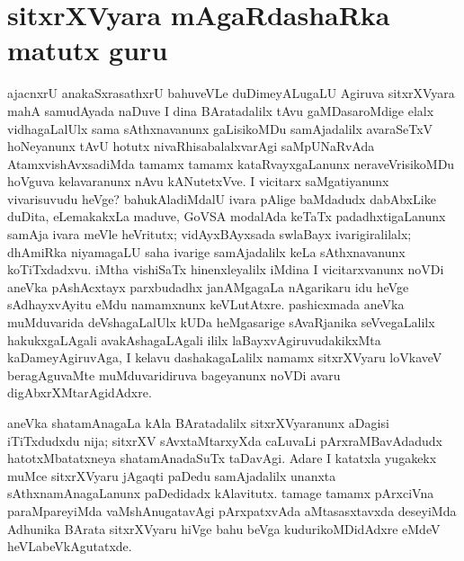 \makeatletter
\def\@makechapterhead#1{%
  \vspace*{10\p@}%
{\fontsize{13pt}{13pt}\selectfont\raggedright{\bf suceVta kaqpalAni}\par}
\vspace*{25\p@}%
  {\parindent \z@ \centering \normalfont
    \ifnum \c@secnumdepth >\m@ne
      \if@mainmatter
        {\LARGE\bfseries  #1}\par\nobreak
	\vskip 4pt
      \fi
    \fi
\smallskip 

 \vskip 10\p@  
{\fontsize{12pt}{12pt}\selectfont\raggedleft{anu: \bf pu.ti.na.}\par}
  }
\vskip 40\p@}
\makeatother

\chapter{sitxrXVyara mAgaRdashaRka matutx guru}


ajacnxrU anakaSxrasathxrU bahuveVLe duDimeyALugaLU Agiruva sitxrXVyara mahA samudAyada naDuve I dina BAratadalilx tAvu gaMDasaroMdige elalx vidhagaLalUlx sama sAthxnavanunx gaLisikoMDu samAjadalilx  avaraSeTxV hoNeyanunx tAvU hotutx nivaRhisabalalxvarAgi saMpUNaRvAda AtamxvishAvxsadiMda tamamx tamamx kataRvayxgaLanunx neraveVrisikoMDu hoVguva kelavaranunx nAvu kANutetxVve. I vicitarx saMgatiyanunx vivarisuvudu heVge? bahukAladiMdalU ivara pAlige baMdadudx dabAbxLike duDita, eLemakakxLa maduve, GoVSA modalAda keTaTx padadhxtigaLanunx samAja ivara meVle heVritutx; vidAyxBAyxsada swlaBayx ivarigiralilalx; dhAmiRka niyamagaLU saha ivarige samAjadalilx keLa sAthxnavanunx koTiTxdadxvu. iMtha vishiSaTx hinenxleyalilx iMdina I vicitarxvanunx noVDi aneVka pAshAcxtayx parxbudadhx janAMgagaLa nAgarikaru idu heVge sAdhayxvAyitu eMdu namamxnunx keVLutAtxre. pashicxmada aneVka muMduvarida deVshagaLalUlx kUDa heMgasarige sAvaRjanika seVvegaLalilx hakukxgaLAgali avakAshagaLAgali ililx laBayxvAgiruvudakikxMta kaDameyAgiruvAga, I kelavu dashakagaLalilx namamx sitxrXVyaru loVkaveV beragAguvaMte muMduvaridiruva bageyanunx noVDi avaru digAbxrXMtarAgidAdxre.

aneVka shatamAnagaLa kAla BAratadalilx sitxrXVyaranunx aDagisi iTiTxdudxdu nija; sitxrXV sAvxtaMtarxyXda caLuvaLi pArxraMBavAdadudx hatotxMbatatxneya shatamAnadaSuTx taDavAgi. Adare I katatxla yugakekx muMce sitxrXVyaru jAgaqti paDedu samAjadalilx unanxta sAthxnamAnagaLanunx paDedidadx kAlavitutx. tamage tamamx pArxciVna paraMpareyiMda vaMshAnugatavAgi pArxpatxvAda aMtasasxtavxda deseyiMda Adhunika BArata sitxrXVyaru hiVge bahu beVga kudurikoMDidAdxre eMdeV heVLabeVkAgutatxde.

